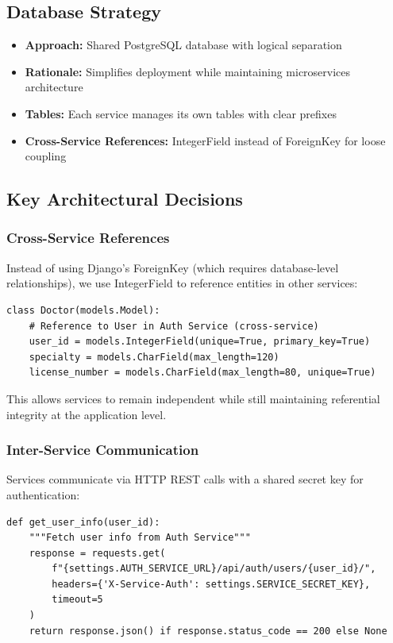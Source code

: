 \documentclass[12pt,a4paper]{article}
\begin{document}
\subsection{Database Strategy}
\begin{itemize}
    \item \textbf{Approach:} Shared PostgreSQL database with logical separation
    \item \textbf{Rationale:} Simplifies deployment while maintaining microservices architecture
    \item \textbf{Tables:} Each service manages its own tables with clear prefixes
    \item \textbf{Cross-Service References:} IntegerField instead of ForeignKey for loose coupling
\end{itemize}

\subsection{Key Architectural Decisions}

\subsubsection{Cross-Service References}
Instead of using Django's ForeignKey (which requires database-level relationships), we use IntegerField to reference entities in other services:

\begin{lstlisting}[style=python]
class Doctor(models.Model):
    # Reference to User in Auth Service (cross-service)
    user_id = models.IntegerField(unique=True, primary_key=True)
    specialty = models.CharField(max_length=120)
    license_number = models.CharField(max_length=80, unique=True)
\end{lstlisting}

This allows services to remain independent while still maintaining referential integrity at the application level.

\subsubsection{Inter-Service Communication}
Services communicate via HTTP REST calls with a shared secret key for authentication:

\begin{lstlisting}[style=python]
def get_user_info(user_id):
    """Fetch user info from Auth Service"""
    response = requests.get(
        f"{settings.AUTH_SERVICE_URL}/api/auth/users/{user_id}/",
        headers={'X-Service-Auth': settings.SERVICE_SECRET_KEY},
        timeout=5
    )
    return response.json() if response.status_code == 200 else None
\end{lstlisting}
\end{document}
